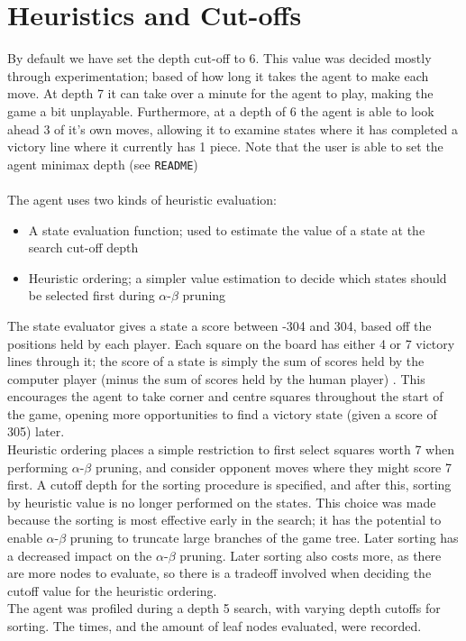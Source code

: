 \documentclass[10pt,twocolumn]{article}
\begin{document}
\section{Heuristics and Cut-offs}
By default we have set the depth cut-off to 6. This value was decided mostly 
through experimentation; based of how long it takes the agent to make each move.
At depth 7 it can take over a minute for the agent to play, making the game a bit unplayable.
Furthermore, at a depth of 6 the agent is able to look ahead 3 of it's own moves,
allowing it to examine states where it has completed a victory line where it currently
has 1 piece. Note that the user is able to set the agent minimax depth (see \texttt{README})\\\\
The agent uses two kinds of heuristic evaluation:
\begin{itemize}
\item[] A state evaluation function; used to estimate the value of a state at the
search cut-off depth
\item[] Heuristic ordering; a simpler value estimation to decide which states
should be selected first during $\alpha$-$\beta$ pruning
\end{itemize}
The state evaluator gives a state a score between -304 and 304, based off the positions held by
each player. Each square on the board has either 4 or 7 victory lines through it; the
score of a state is simply the sum of scores held by the computer player (minus the sum
of scores held by the human player) \cite{Bogenschutz2010}. This encourages the agent to take corner and centre
squares throughout the start of the game, opening more opportunities to find a victory state 
(given a score of 305) later.\\
Heuristic ordering places a simple restriction to first select squares worth 7
when performing $\alpha$-$\beta$ pruning, and consider opponent moves where they
might score 7 first. A cutoff depth for the sorting procedure is specified,
and after this, sorting by heuristic value is no longer performed on the states. This choice was made
because the sorting is most effective early in the search; it has the potential to enable $\alpha$-$\beta$ pruning
to truncate large branches of the game tree. Later sorting has a decreased impact on the $\alpha$-$\beta$ pruning. Later sorting
also costs more, as there are more nodes to evaluate, so there is a tradeoff involved when deciding the cutoff value for the
heuristic ordering.\\
The agent was profiled during a depth 5 search, with varying depth cutoffs for sorting. The times, and the amount of leaf nodes evaluated, were recorded.
\end{document}
